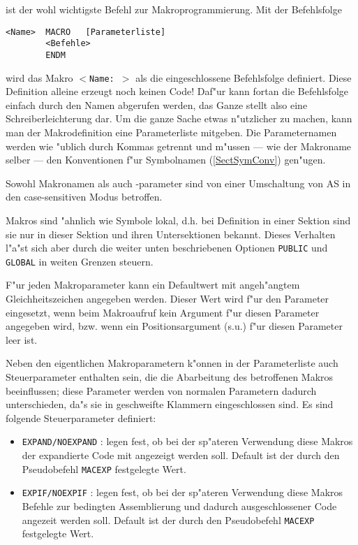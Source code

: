 \documentclass[12pt,a4paper,twoside]{report}
\newcommand{\tty}[1]{{\tt #1}}
\begin{document}
{ist der wohl wichtigste Befehl zur Makroprogrammierung.  Mit der
Befehlsfolge
\begin{verbatim}
<Name>  MACRO   [Parameterliste]
        <Befehle>
        ENDM
\end{verbatim}
wird das Makro \tty{$<$Name:  $>$} als die eingeschlossene Befehlsfolge
definiert. Diese Definition alleine erzeugt noch keinen Code!  Daf"ur kann
fortan die Befehlsfolge einfach durch den Namen abgerufen werden, das Ganze
stellt also eine Schreiberleichterung dar.  Um die ganze Sache etwas
n"utzlicher zu machen, kann man der Makrodefinition eine Parameterliste
mitgeben.  Die Parameternamen werden wie "ublich durch Kommas getrennt
und m"ussen --- wie der Makroname selber --- den Konventionen f"ur
Symbolnamen (\ref{SectSymConv}) gen"ugen.
\par
Sowohl Makronamen als auch -parameter sind von einer Umschaltung
von AS in den case-sensitiven Modus betroffen.
\par
Makros sind "ahnlich wie Symbole lokal, d.h. bei Definition in
einer Sektion sind sie nur in dieser Sektion und ihren Untersektionen
bekannt.  Dieses Verhalten l"a"st sich aber durch die weiter unten
beschriebenen Optionen \tty{PUBLIC} und \tty{GLOBAL} in weiten Grenzen
steuern.
\par
F"ur jeden Makroparameter kann ein Defaultwert mit angeh"angtem
Gleichheitszeichen angegeben werden.  Dieser Wert wird f"ur den
Parameter eingesetzt, wenn beim Makroaufruf kein Argument f"ur
diesen Parameter angegeben wird, bzw. wenn ein Positionsargument
(s.u.) f"ur diesen Parameter leer ist.
\par
Neben den eigentlichen Makroparametern k"onnen in der Parameterliste
auch Steuerparameter enthalten sein, die die Abarbeitung des betroffenen
Makros beeinflussen; diese Parameter werden von normalen Parametern
dadurch unterschieden, da"s sie in geschweifte Klammern eingeschlossen
sind.  Es sind folgende Steuerparameter definiert:
\begin{itemize}
\item{\tty{EXPAND/NOEXPAND} : legen fest, ob bei der sp"ateren
      Verwendung diese Makros der expandierte Code mit angezeigt
      werden soll.  Default ist der durch den Pseudobefehl \tty{MACEXP}
      festgelegte Wert.}
\item{\tty{EXPIF/NOEXPIF} : legen fest, ob bei der sp"ateren
      Verwendung diese Makros Befehle zur bedingten Assemblierung
      und dadurch ausgeschlossener Code angezeit werden soll.  Default
      ist der durch den Pseudobefehl \tty{MACEXP} festgelegte Wert.}

\end{itemize}}
\end{document}
